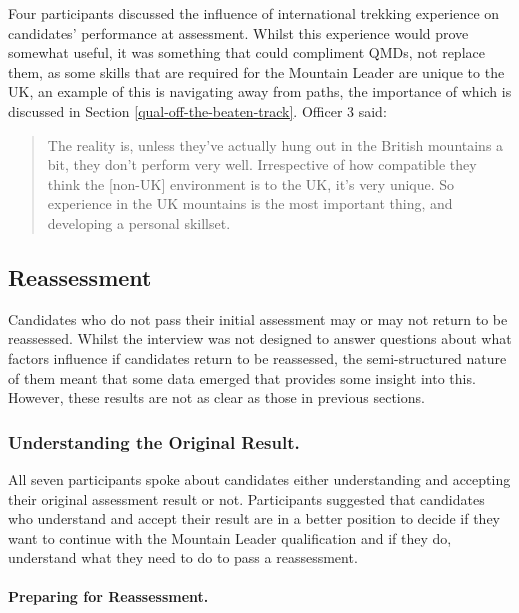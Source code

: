 \documentclass[
  12pt,
  a4paper,
]{book}
\begin{document}
Four participants discussed the influence of international trekking experience on candidates' performance at assessment. Whilst this experience would prove somewhat useful, it was something that could compliment QMDs, not replace them, as some skills that are required for the Mountain Leader are unique to the UK, an example of this is navigating away from paths, the importance of which is discussed in Section \ref{qual-off-the-beaten-track}. Officer 3 said:

\begin{quote}
The reality is, unless they've actually hung out in the British mountains a bit, they don't perform very well. Irrespective of how compatible they think the {[}non-UK{]} environment is to the UK, it's very unique. So experience in the UK mountains is the most important thing, and developing a personal skillset.
\end{quote}

\hypertarget{reassessment}{%
\subsection{Reassessment}\label{reassessment}}

Candidates who do not pass their initial assessment may or may not return to be reassessed. Whilst the interview was not designed to answer questions about what factors influence if candidates return to be reassessed, the semi-structured nature of them meant that some data emerged that provides some insight into this. However, these results are not as clear as those in previous sections.

\hypertarget{understanding-the-original-result.}{%
\subsubsection{Understanding the Original Result.}\label{understanding-the-original-result.}}

All seven participants spoke about candidates either understanding and accepting their original assessment result or not. Participants suggested that candidates who understand and accept their result are in a better position to decide if they want to continue with the Mountain Leader qualification and if they do, understand what they need to do to pass a reassessment.

\hypertarget{preparing-for-reassessment.}{%
\paragraph{Preparing for Reassessment.}\label{preparing-for-reassessment.}}
\end{document}
